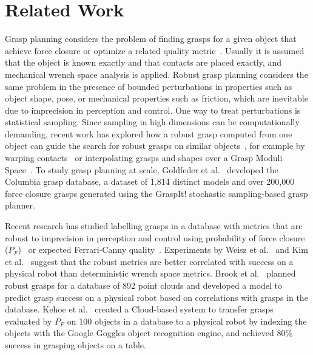 \section{Related Work}

Grasp planning considers the problem of finding grasps for a given object that achieve force closure or optimize a related quality metric~\cite{pokorny2013c}.
Usually it is assumed that the object is known exactly and that contacts are placed exactly, and mechanical wrench space analysis is applied.
Robust grasp planning considers the same problem in the presence of bounded perturbations in properties such as object shape, pose, or mechanical properties such as friction, which are inevitable due to imprecision in perception and control.
One way to treat perturbations is statistical sampling.
Since sampling in high dimensions can be computationally demanding, recent work has explored how a robust grasp computed from one object can guide the search for robust grasps on similar objects~\cite{bohg2014data}, for example by warping contacts~\cite{stouraitis2015functional} or interpolating grasps and shapes over a Grasp Moduli Space~\cite{pokorny2013grasp}.
To study grasp planning at scale, Goldfeder et al.~\cite{goldfeder2009columbia, goldfeder2011data} developed the Columbia grasp database, a dataset of 1,814 distinct models and over 200,000 force closure grasps generated using the GraspIt! stochastic sampling-based grasp planner.

Recent research has studied labelling grasps in a database with metrics that are robust to imprecision in perception and control using probability of force closure ($P_F$)~\cite{weisz2012pose} or expected Ferrari-Canny quality~\cite{kim2012physically}.
Experiments by Weisz et al.~\cite{weisz2012pose} and Kim et al.~\cite{kim2012physically} suggest that the robust metrics are better correlated with success on a physical robot than deterministic wrench space metrics.
Brook et al.~\cite{brook2011collaborative} planned robust grasps for a database of 892 point clouds and developed a model to predict grasp success on a physical robot based on correlations with grasps in the database.   
Kehoe et al.~\cite{kehoe2013cloud} created a Cloud-based system to transfer grasps evaluated by $P_F$ on 100 objects in a database to a physical robot by indexing the objects with the Google Goggles object recognition engine, and achieved 80\% success in grasping objects on a table.

